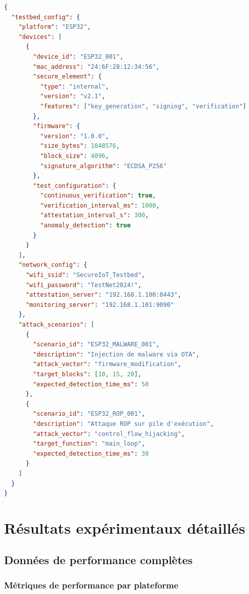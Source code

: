 \begin{lstlisting}[language=JSON, caption={Configuration JSON pour les tests ESP32}]
{
  "testbed_config": {
    "platform": "ESP32",
    "devices": [
      {
        "device_id": "ESP32_001",
        "mac_address": "24:6F:28:12:34:56",
        "secure_element": {
          "type": "internal",
          "version": "v2.1",
          "features": ["key_generation", "signing", "verification"]
        },
        "firmware": {
          "version": "1.0.0",
          "size_bytes": 1048576,
          "block_size": 4096,
          "signature_algorithm": "ECDSA_P256"
        },
        "test_configuration": {
          "continuous_verification": true,
          "verification_interval_ms": 1000,
          "attestation_interval_s": 300,
          "anomaly_detection": true
        }
      }
    ],
    "network_config": {
      "wifi_ssid": "SecureIoT_Testbed",
      "wifi_password": "TestNet2024!",
      "attestation_server": "192.168.1.100:8443",
      "monitoring_server": "192.168.1.101:9090"
    },
    "attack_scenarios": [
      {
        "scenario_id": "ESP32_MALWARE_001",
        "description": "Injection de malware via OTA",
        "attack_vector": "firmware_modification",
        "target_blocks": [10, 15, 20],
        "expected_detection_time_ms": 50
      },
      {
        "scenario_id": "ESP32_ROP_001", 
        "description": "Attaque ROP sur pile d'exécution",
        "attack_vector": "control_flow_hijacking",
        "target_function": "main_loop",
        "expected_detection_time_ms": 30
      }
    ]
  }
}
\end{lstlisting}

\chapter{Résultats expérimentaux détaillés}
\label{app:experimental-results}

\section{Données de performance complètes}

\subsection{Métriques de performance par plateforme}

